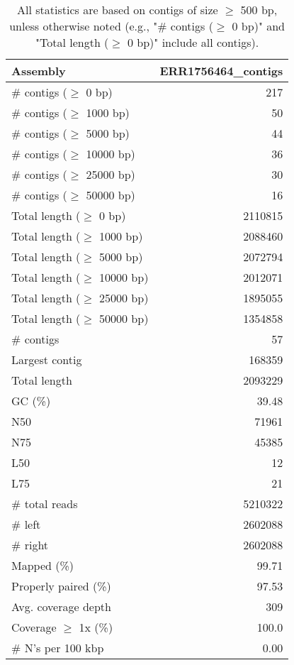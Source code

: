 \documentclass[12pt,a4paper]{article}
\begin{document}
\begin{table}[ht]
\begin{center}
\caption{All statistics are based on contigs of size $\geq$ 500 bp, unless otherwise noted (e.g., "\# contigs ($\geq$ 0 bp)" and "Total length ($\geq$ 0 bp)" include all contigs).}
\begin{tabular}{|l*{1}{|r}|}
\hline
Assembly & ERR1756464\_contigs \\ \hline
\# contigs ($\geq$ 0 bp) & 217 \\ \hline
\# contigs ($\geq$ 1000 bp) & 50 \\ \hline
\# contigs ($\geq$ 5000 bp) & 44 \\ \hline
\# contigs ($\geq$ 10000 bp) & 36 \\ \hline
\# contigs ($\geq$ 25000 bp) & 30 \\ \hline
\# contigs ($\geq$ 50000 bp) & 16 \\ \hline
Total length ($\geq$ 0 bp) & 2110815 \\ \hline
Total length ($\geq$ 1000 bp) & 2088460 \\ \hline
Total length ($\geq$ 5000 bp) & 2072794 \\ \hline
Total length ($\geq$ 10000 bp) & 2012071 \\ \hline
Total length ($\geq$ 25000 bp) & 1895055 \\ \hline
Total length ($\geq$ 50000 bp) & 1354858 \\ \hline
\# contigs & 57 \\ \hline
Largest contig & 168359 \\ \hline
Total length & 2093229 \\ \hline
GC (\%) & 39.48 \\ \hline
N50 & 71961 \\ \hline
N75 & 45385 \\ \hline
L50 & 12 \\ \hline
L75 & 21 \\ \hline
\# total reads & 5210322 \\ \hline
\# left & 2602088 \\ \hline
\# right & 2602088 \\ \hline
Mapped (\%) & 99.71 \\ \hline
Properly paired (\%) & 97.53 \\ \hline
Avg. coverage depth & 309 \\ \hline
Coverage $\geq$ 1x (\%) & 100.0 \\ \hline
\# N's per 100 kbp & 0.00 \\ \hline
\end{tabular}
\end{center}
\end{table}
\end{document}
